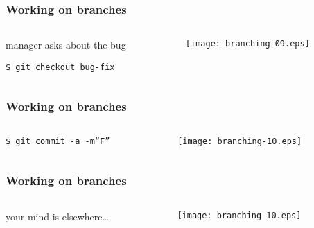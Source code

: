 \documentclass[english]{beamer}
\newcommand{\CMD}[1]{%
\texttt{\textcolor{code-blue}{#1}}%
}
\begin{document}
\begin{frame}
\frametitle{Working on branches}

\begin{columns}[t]
        \begin{column}[T]{.5\textwidth}
                manager asks about the bug

                \vspace{\baselineskip}
                {\small
                \CMD{\$ git checkout bug-fix} \\
                }
        \end{column}
        \begin{column}[T]{.5\textwidth}
                \texttt{[image: branching-09.eps]}
        \end{column}
\end{columns}
\end{frame}

\begin{frame}
\frametitle{Working on branches}

\begin{columns}[t]
        \begin{column}[T]{.5\textwidth}
                {\small
                \CMD{\$ git commit -a -m``F''} \\
                }
        \end{column}
        \begin{column}[T]{.5\textwidth}
                \texttt{[image: branching-10.eps]}
        \end{column}
\end{columns}
\end{frame}

\begin{frame}
\frametitle{Working on branches}

\begin{columns}[t]
        \begin{column}[T]{.5\textwidth}
                your mind is elsewhere\ldots
        \end{column}
        \begin{column}[T]{.5\textwidth}
                \texttt{[image: branching-10.eps]}
        \end{column}
\end{columns}
\end{frame}
\end{document}
